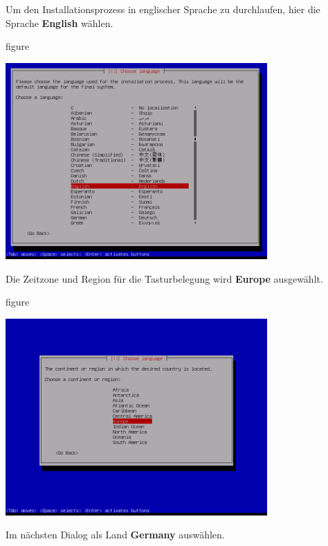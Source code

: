 Um den Installationsprozess in englischer Sprache zu durchlaufen, hier die
Sprache \textbf{English} wählen.

\begin{nofloat}{figure}
\begin{center}
\includegraphics[width=0.75\textwidth]{screenshots/03_ubuntu_install.png}
\end{center}
\end{nofloat}

Die Zeitzone und Region für die Tasturbelegung wird \textbf{Europe} ausgewählt.

\begin{nofloat}{figure}
\begin{center}
\includegraphics[width=0.75\textwidth]{screenshots/04_ubuntu_install.png}
\end{center}
\end{nofloat}
\newpage
Im nächsten Dialog als Land \textbf{Germany} auswählen.

